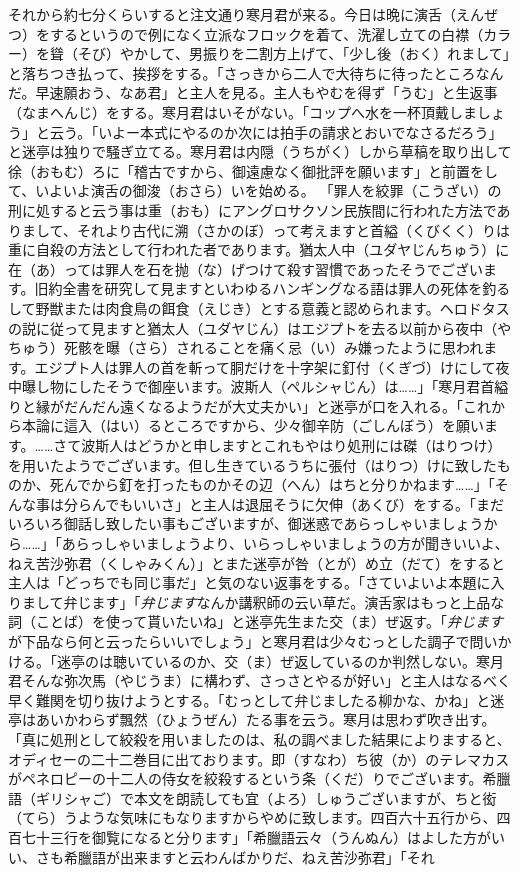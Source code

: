 \documentclass{book}
\begin{document}
それから約七分くらいすると注文通り寒月君が来る。今日は晩に演舌（えんぜつ）をするというので例になく立派なフロックを着て、洗濯し立ての白襟（カラー）を聳（そび）やかして、男振りを二割方上げて、「少し後（おく）れまして」と落ちつき払って、挨拶をする。「さっきから二人で大待ちに待ったところなんだ。早速願おう、なあ君」と主人を見る。主人もやむを得ず「うむ」と生返事（なまへんじ）をする。寒月君はいそがない。「コップへ水を一杯頂戴しましょう」と云う。「いよー本式にやるのか次には拍手の請求とおいでなさるだろう」と迷亭は独りで騒ぎ立てる。寒月君は内隠（うちがく）しから草稿を取り出して徐（おもむ）ろに「稽古ですから、御遠慮なく御批評を願います」と前置をして、いよいよ演舌の御浚（おさら）いを始める。
「罪人を絞罪（こうざい）の刑に処すると云う事は重（おも）にアングロサクソン民族間に行われた方法でありまして、それより古代に溯（さかのぼ）って考えますと首縊（くびくく）りは重に自殺の方法として行われた者であります。猶太人中（ユダヤじんちゅう）に在（あ）っては罪人を石を抛（な）げつけて殺す習慣であったそうでございます。旧約全書を研究して見ますといわゆるハンギングなる語は罪人の死体を釣るして野獣または肉食鳥の餌食（えじき）とする意義と認められます。ヘロドタスの説に従って見ますと猶太人（ユダヤじん）はエジプトを去る以前から夜中（やちゅう）死骸を曝（さら）されることを痛く忌（い）み嫌ったように思われます。エジプト人は罪人の首を斬って胴だけを十字架に釘付（くぎづ）けにして夜中曝し物にしたそうで御座います。波斯人（ペルシャじん）は\ldots{}\ldots{}」「寒月君首縊りと縁がだんだん遠くなるようだが大丈夫かい」と迷亭が口を入れる。「これから本論に這入（はい）るところですから、少々御辛防（ごしんぼう）を願います。\ldots{}\ldots{}さて波斯人はどうかと申しますとこれもやはり処刑には磔（はりつけ）を用いたようでございます。但し生きているうちに張付（はりつ）けに致したものか、死んでから釘を打ったものかその辺（へん）はちと分りかねます\ldots{}\ldots{}」「そんな事は分らんでもいいさ」と主人は退屈そうに欠伸（あくび）をする。「まだいろいろ御話し致したい事もございますが、御迷惑であらっしゃいましょうから\ldots{}\ldots{}」「あらっしゃいましょうより、いらっしゃいましょうの方が聞きいいよ、ねえ苦沙弥君（くしゃみくん）」とまた迷亭が咎（とが）め立（だて）をすると主人は「どっちでも同じ事だ」と気のない返事をする。「さていよいよ本題に入りまして弁じます」「\emph{弁じます}なんか講釈師の云い草だ。演舌家はもっと上品な詞（ことば）を使って貰いたいね」と迷亭先生また交（ま）ぜ返す。「\emph{弁じます}が下品なら何と云ったらいいでしょう」と寒月君は少々むっとした調子で問いかける。「迷亭のは聴いているのか、交（ま）ぜ返しているのか判然しない。寒月君そんな弥次馬（やじうま）に構わず、さっさとやるが好い」と主人はなるべく早く難関を切り抜けようとする。「むっとして弁じましたる柳かな、かね」と迷亭はあいかわらず飄然（ひょうぜん）たる事を云う。寒月は思わず吹き出す。「真に処刑として絞殺を用いましたのは、私の調べました結果によりますると、オディセーの二十二巻目に出ております。即（すなわ）ち彼（か）のテレマカスがペネロピーの十二人の侍女を絞殺するという条（くだ）りでございます。希臘語（ギリシャご）で本文を朗読しても宜（よろ）しゅうございますが、ちと衒（てら）うような気味にもなりますからやめに致します。四百六十五行から、四百七十三行を御覧になると分ります」「希臘語云々（うんぬん）はよした方がいい、さも希臘語が出来ますと云わんばかりだ、ねえ苦沙弥君」「それ
\end{document}
